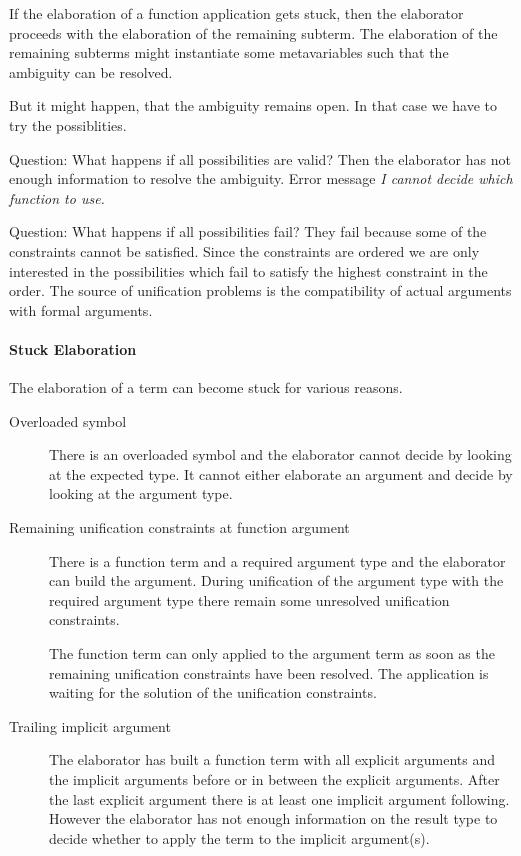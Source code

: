 If the elaboration of a function application gets stuck, then the elaborator
proceeds with the elaboration of the remaining subterm. The elaboration of the
remaining subterms might instantiate some metavariables such that the ambiguity
can be resolved.

But it might happen, that the ambiguity remains open. In that case we have to
try the possiblities.

Question: What happens if all possibilities are valid? Then the elaborator has
not enough information to resolve the ambiguity. Error message \emph{I cannot
decide which function to use.}

Question: What happens if all possibilities fail? They fail because some of the
constraints cannot be satisfied. Since the constraints are ordered we are only
interested in the possibilities which fail to satisfy the highest constraint in
the order. The source of unification problems is the compatibility of actual
arguments with formal arguments.



\paragraph{Stuck Elaboration} The elaboration of a term can become stuck for
various reasons.

\begin{description}

    \item [Overloaded symbol]

        There is an overloaded symbol and the elaborator cannot decide by
        looking at the expected type. It cannot either elaborate an argument and
        decide by looking at the argument type.

    \item [Remaining unification constraints at function argument]

        There is a function term and a required argument type and the elaborator
        can build the argument. During unification of the argument type with the
        required argument type there remain some unresolved unification
        constraints.

        The function term can only applied to the argument term as soon as the
        remaining unification constraints have been resolved. The application is
        waiting for the solution of the unification constraints.

    \item [Trailing implicit argument]

        The elaborator has built a function term with all explicit arguments and
        the implicit arguments before or in between the explicit arguments.
        After the last explicit argument there is at least one implicit argument
        following. However the elaborator has not enough information on the
        result type to decide whether to apply the term to the implicit
        argument(s).

\end{description}

